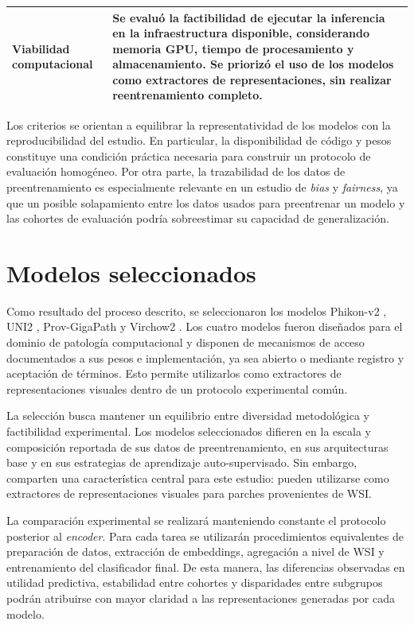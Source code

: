 \begin{table}[htbp]
\begin{tabular}{p{3.7cm} p{10.3cm}}
Viabilidad computacional &
Se evaluó la factibilidad de ejecutar la inferencia en la infraestructura disponible, considerando memoria GPU, tiempo de procesamiento y almacenamiento. Se priorizó el uso de los modelos como extractores de representaciones, sin realizar reentrenamiento completo. \\

\bottomrule
\end{tabular}
\end{table}

Los criterios se orientan a equilibrar la representatividad de los modelos con la reproducibilidad del estudio. En particular, la disponibilidad de código y pesos constituye una condición práctica necesaria para construir un protocolo de evaluación homogéneo. Por otra parte, la trazabilidad de los datos de preentrenamiento es especialmente relevante en un estudio de \textit{bias} y \textit{fairness}, ya que un posible solapamiento entre los datos usados para preentrenar un modelo y las cohortes de evaluación podría sobreestimar su capacidad de generalización.

\section{Modelos seleccionados}
\label{sec:modelos_seleccionados}

Como resultado del proceso descrito, se seleccionaron los modelos Phikon-v2 \parencite{filiot2024phikonv2}, UNI2 \parencite{chen2024uni}, Prov-GigaPath \parencite{xu2024provgigapath} y Virchow2 \parencite{vorontsov2024virchow}. Los cuatro modelos fueron diseñados para el dominio de patología computacional y disponen de mecanismos de acceso documentados a sus pesos e implementación, ya sea abierto o mediante registro y aceptación de términos. Esto permite utilizarlos como extractores de representaciones visuales dentro de un protocolo experimental común.

La selección busca mantener un equilibrio entre diversidad metodológica y factibilidad experimental. Los modelos seleccionados difieren en la escala y composición reportada de sus datos de preentrenamiento, en sus arquitecturas base y en sus estrategias de aprendizaje auto-supervisado. Sin embargo, comparten una característica central para este estudio: pueden utilizarse como extractores de representaciones visuales para parches provenientes de WSI.

La comparación experimental se realizará manteniendo constante el protocolo posterior al \textit{encoder}. Para cada tarea se utilizarán procedimientos equivalentes de preparación de datos, extracción de embeddings, agregación a nivel de WSI y entrenamiento del clasificador final. De esta manera, las diferencias observadas en utilidad predictiva, estabilidad entre cohortes y disparidades entre subgrupos podrán atribuirse con mayor claridad a las representaciones generadas por cada modelo.

